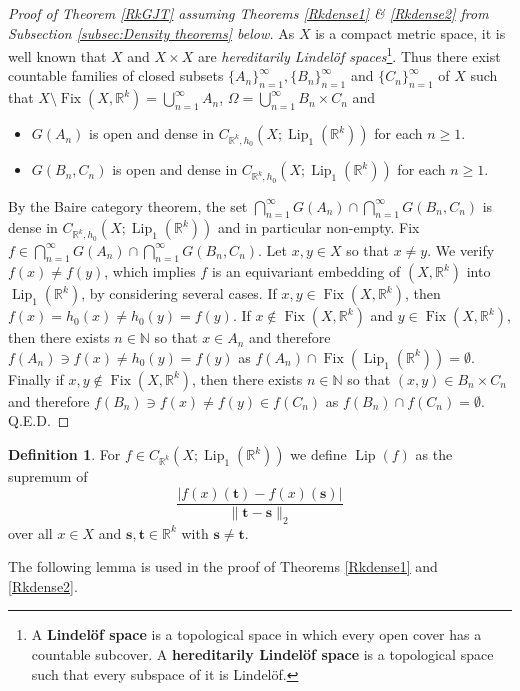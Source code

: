 \documentclass[11pt]{article}
\theoremstyle{plain}
\theoremstyle{definition}
\newtheorem{defn}[thm]{Definition}
\DeclareMathOperator{\Lip}{Lip}
\DeclareMathOperator{\Fix}{Fix}
\def\Rk{\mathbb{R}^k}
\def\N{\mathbb{N}}
\def\tt{\mathbf t}
\def\ss{\mathbf s}
\numberwithin{figure}{section}
\begin{document}
\begin{proof}[Proof of Theorem \ref{RkGJT} assuming Theorems \ref{Rkdense1} \& \ref{Rkdense2} from Subsection \ref{subsec:Density theorems} below]
 As $X$ is a compact metric space, it is well known that $X$ and $X\times X$ are \textit{hereditarily Lindelöf spaces}\footnote{A \textbf{Lindelöf space} is a topological space in which every open cover has a countable subcover. A \textbf{hereditarily Lindelöf space} is a topological space such that every subspace of it is Lindelöf.}. Thus there exist countable families of closed subsets $\{A_n\}_{n=1}^{\infty},\{B_n\}_{n=1}^{\infty}$ and $\{C_n\}_{n=1}^{\infty}$ of $X$ such that     $X\setminus\Fix(X,\Rk)=\bigcup_{n=1}^{\infty}A_n$, $\Omega=\bigcup_{n=1}^{\infty}B_n\times C_n$ and   \begin{itemize}
         
    \item $G(A_n)$ is open and dense in $C_{\Rk,h_0}(X;\Lip_{1}(\Rk))$ for each $n\geq1$.
    \item $G(B_n,C_n)$ is open and dense in $C_{\Rk,h_0}(X;\Lip_{1}(\Rk))$ for each $n\geq1$.
\end{itemize}
    
By the Baire category theorem, the set $\bigcap\limits_{n=1}^{\infty}G(A_n)\cap\bigcap\limits_{n=1}^{\infty}G(B_n,C_n)$ is dense in $C_{\Rk,h_0}(X;\Lip_{1}(\Rk))$ and in particular non-empty. Fix $f\in \bigcap\limits_{n=1}^{\infty}G(A_n)\cap\bigcap\limits_{n=1}^{\infty}G(B_n,C_n)$. Let  $x,y\in X$ so that $x\neq y$. We verify $f(x)\neq f(y)$, which implies $f$ is an equivariant embedding of  $(X,\Rk)$ into $\Lip_{1}(\Rk)$, by considering several cases. If $x,y\in \Fix(X,\Rk)$, then $f(x)=h_0(x)\neq h_0(y)=f(y)$. If $x\notin \Fix(X,\Rk)$ and $y\in \Fix(X,\Rk)$, then there exists $n\in \N$ so that $x\in A_n$ and therefore $ f(A_n)\ni f(x)\neq h_0(y)= f(y)$ as $f(A_n)\cap\Fix(\Lip_{1}(\Rk))=\emptyset$.   Finally if   $x,y\notin \Fix(X,\Rk)$, then there exists $n\in \N$ so that $(x,y)\in B_n\times C_n$ and therefore $ f(B_n)\ni f(x)\neq f(y)\in f(C_n)$ as $f(B_n)\cap f(C_n)=\emptyset$.
 Q.E.D.

\end{proof}



\begin{defn}
For $f\in C_{\Rk}(X;\Lip_{1}(\Rk))$ we define $\Lip(f)$ as the supremum of
    \begin{equation*}
        \frac{|f(x)(\tt)-f(x)(\ss)|}{\|\mathbf {t-s}\|_2}
    \end{equation*}
    over all $x\in X$ and $\mathbf {s,t}\in\Rk$ with $\mathbf s\neq \mathbf t$.
    \end{defn}
The following lemma is used in the proof of Theorems \ref{Rkdense1} and \ref{Rkdense2}. 
\end{document}

